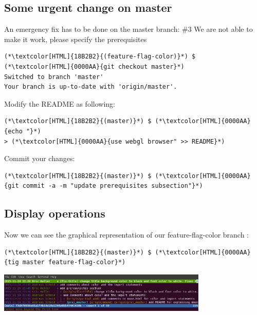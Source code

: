 \subsection{Some urgent change on master}
\begin{frame}[fragile]
  \subslidetitle

  An emergency fix has to be done on the master branch:
  \newline \vspace{1em}
  \#3 We are not able to make it work, please specify the prerequisites
  \begin{lstlisting}
(*\textcolor[HTML]{18B2B2}{(feature-flag-color)}*) $ (*\textcolor[HTML]{0000AA}{git checkout master}*)
Switched to branch 'master'
Your branch is up-to-date with 'origin/master'.
\end{lstlisting}

  Modify the README as following:
  \begin{lstlisting}
(*\textcolor[HTML]{18B2B2}{(master)}*) $ (*\textcolor[HTML]{0000AA}{echo "}*)
> (*\textcolor[HTML]{0000AA}{use webgl browser" >> README}*)
\end{lstlisting}

  Commit your changes:
  \begin{lstlisting}
(*\textcolor[HTML]{18B2B2}{(master)}*) $ (*\textcolor[HTML]{0000AA}{git commit -a -m "update prerequisites subsection"}*)
\end{lstlisting}

\end{frame}
\subsection{Display operations}
\begin{frame}[fragile]
  \subslidetitle

  Now we can see the graphical representation of our feature-flag-color branch :
  \begin{lstlisting}
(*\textcolor[HTML]{18B2B2}{(master)}*) $ (*\textcolor[HTML]{0000AA}{tig master feature-flag-color}*)
\end{lstlisting}

  \vspace{1em}

  \centerline{\includegraphics[width=10cm]{../screen/tig-fix-title-rebase-master.png}}

\end{frame}
